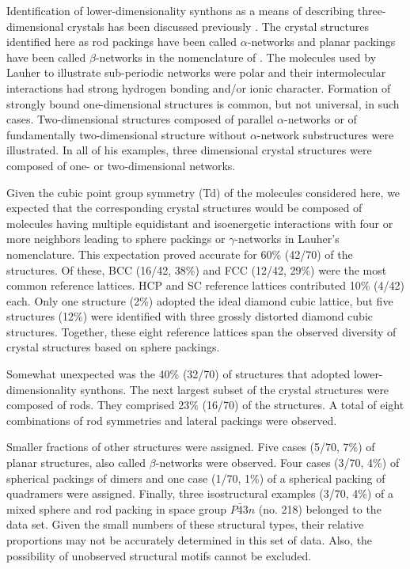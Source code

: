 \documentclass{iucr}              %
\begin{document}
Identification of lower-dimensionality synthons as a means of describing three-dimensional crystals has been discussed previously \cite{Lauher04}.  The crystal structures identified here as rod packings have been called $\alpha$-networks and planar packings have been called $\beta$-networks in the nomenclature of \cite{Lauher04}.  The molecules used by Lauher to illustrate sub-periodic networks were polar and their intermolecular interactions had strong hydrogen bonding and/or ionic character.  Formation of strongly bound one-dimensional structures is common, but not universal, in such cases.  Two-dimensional structures composed of parallel $\alpha$-networks or of fundamentally two-dimensional structure without $\alpha$-network substructures were illustrated.  In all of his examples, three dimensional crystal structures were composed of one- or two-dimensional networks.

Given the cubic point group symmetry (Td) of the molecules considered here, we expected that the corresponding crystal structures would be composed of molecules having multiple equidistant and isoenergetic interactions with four or more neighbors leading to sphere packings or $\gamma$-networks in Lauher's nomenclature.  This expectation proved accurate for 60\% (42/70) of the structures.  Of these, BCC (16/42, 38\%) and FCC (12/42, 29\%) were the most common reference lattices.  HCP and SC reference lattices contributed 10\% (4/42) each.  Only one structure (2\%) adopted the ideal diamond cubic lattice, but five structures (12\%) were identified with three grossly distorted diamond cubic structures.  Together, these eight reference lattices span the observed diversity of crystal structures based on sphere packings.  

Somewhat unexpected was the 40\% (32/70) of structures that adopted lower-dimensionality synthons.  The next largest subset of the crystal structures were composed of rods.  They comprised 23\% (16/70) of the structures.  A total of eight combinations of rod symmetries and lateral packings were observed.

Smaller fractions of other structures were assigned.  Five cases (5/70, 7\%) of planar structures, also called $\beta$-networks were observed.  Four cases (3/70, 4\%) of spherical packings of dimers and one case (1/70, 1\%) of a spherical packing of quadramers were assigned.  Finally, three isostructural examples (3/70, 4\%) of a mixed sphere and rod packing in space group $P\bar{4}3n$ (no. 218) belonged to the data set.  Given the small numbers of these structural types, their relative proportions may not be accurately determined in this set of data.  Also, the possibility of unobserved structural motifs cannot be excluded.
\end{document}
